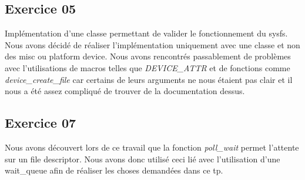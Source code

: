 \documentclass{ReportTemplate}
\begin{document}
\subsection{Exercice 05}
Implémentation d'une classe permettant de valider le fonctionnement du sysfs. 
Nous avons décidé de réaliser l'implémentation uniquement avec une classe et non
des misc ou platform device. Nous avons rencontrés passablement de problèmes
avec l'utilisations de macros telles que \textit{DEVICE\_ATTR} et de fonctions
comme \textit{device\_create\_file} car certains de leurs arguments ne nous
étaient pas clair et il nous a été assez compliqué de trouver de la
documentation dessus.
\subsection{Exercice 07}
Nous avons découvert lors de ce travail que la fonction \textit{poll\_wait}
permet l'attente sur un file descriptor. Nous avons donc utilisé ceci lié avec
l'utilisation d'une wait\_queue afin de réaliser les choses demandées dans ce
tp.
\end{document}
